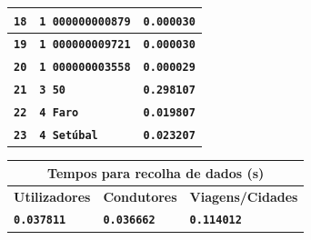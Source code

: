 \documentclass[12pt,a4paper]{report}
\begin{document}
\begin{tabularx}{\textwidth} { 
  | >{\centering\arraybackslash}X 
  | >{\centering\arraybackslash}X 
  | >{\centering\arraybackslash}X | }
 \hline
 \texttt{\textbf{18}} & \texttt{\textbf{1 000000000879}}  & \texttt{\textbf{0.000030}}  \\
 \hline
 \texttt{\textbf{19}} & \texttt{\textbf{1 000000009721}}  & \texttt{\textbf{0.000030}}  \\
 \hline
 \texttt{\textbf{20}} & \texttt{\textbf{1 000000003558}}  & \texttt{\textbf{0.000029}}  \\
 \hline
 \texttt{\textbf{21}} & \texttt{\textbf{3 50}}  & \texttt{\textbf{0.298107}}  \\
 \hline
 \texttt{\textbf{22}} & \texttt{\textbf{4 Faro}}  & \texttt{\textbf{0.019807}}  \\
 \hline
 \texttt{\textbf{23}} & \texttt{\textbf{4 Setúbal}}  & \texttt{\textbf{0.023207}}  \\
 \hline
\end{tabularx}

\vspace{15pt}
\begin{center}
\begin{tabular}{ |p{4.73cm}|p{4.73cm}|p{4.73cm}|  }
 \hline
 \multicolumn{3}{|c|}{\textbf{Tempos para recolha de dados (s)}} \\
 \hline
 \centering\textbf{Utilizadores} & \hfil \textbf{Condutores} & \hfil \textbf{Viagens/Cidades} \\
 \hline
 \centering\textbf{\texttt{0.037811}} & \hfil \texttt{\textbf{0.036662}} & \hfil \texttt{\textbf{0.114012}}\\
 \hline
\end{tabular}
\end{center}
\end{document}
